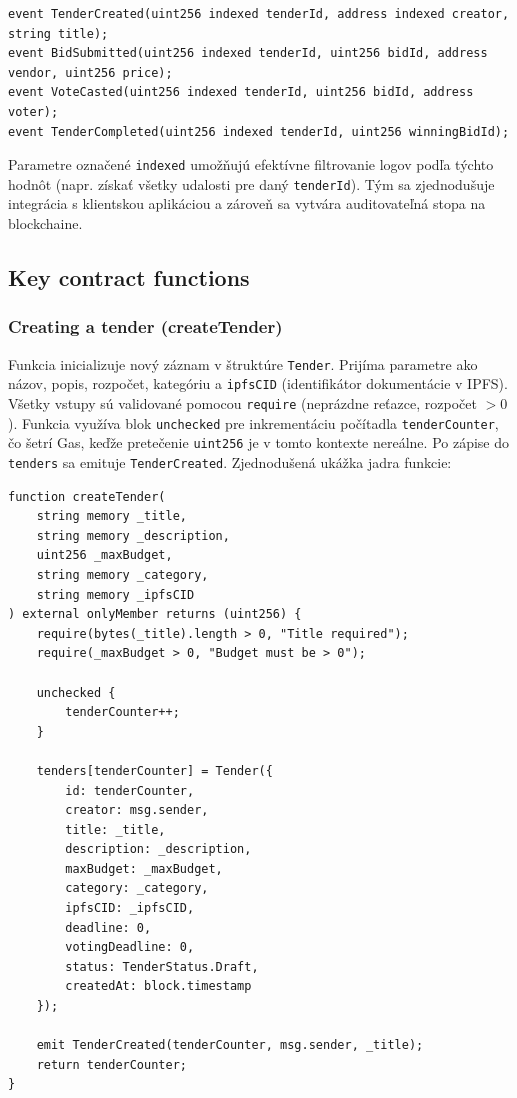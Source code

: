 \begin{lstlisting}[language=Solidity, caption={Vybraté deklarácie eventov v MicroTender.sol}, label={lst:events}]
event TenderCreated(uint256 indexed tenderId, address indexed creator, string title);
event BidSubmitted(uint256 indexed tenderId, uint256 bidId, address vendor, uint256 price);
event VoteCasted(uint256 indexed tenderId, uint256 bidId, address voter);
event TenderCompleted(uint256 indexed tenderId, uint256 winningBidId);
\end{lstlisting}

Parametre označené \texttt{indexed} umožňujú efektívne filtrovanie logov podľa týchto hodnôt (napr. získať všetky udalosti pre daný \texttt{tenderId}). Tým sa zjednodušuje integrácia s klientskou aplikáciou a zároveň sa vytvára auditovateľná stopa na blockchaine.

\subsection{Key contract functions}

\subsubsection{Creating a tender (createTender)}

Funkcia inicializuje nový záznam v štruktúre \texttt{Tender}. Prijíma parametre ako názov, popis, rozpočet, kategóriu a \texttt{ipfsCID} (identifikátor dokumentácie v IPFS). Všetky vstupy sú validované pomocou \texttt{require} (neprázdne reťazce, rozpočet $> 0$). Funkcia využíva blok \texttt{unchecked} pre inkrementáciu počítadla \texttt{tenderCounter}, čo šetrí Gas, keďže pretečenie \texttt{uint256} je v tomto kontexte nereálne. Po zápise do \texttt{tenders} sa emituje \texttt{TenderCreated}. Zjednodušená ukážka jadra funkcie:

\begin{lstlisting}[language=Solidity, caption={Jadro funkcie createTender (validácia a zápis)}, label={lst:create-tender-code}]
function createTender(
    string memory _title,
    string memory _description,
    uint256 _maxBudget,
    string memory _category,
    string memory _ipfsCID
) external onlyMember returns (uint256) {
    require(bytes(_title).length > 0, "Title required");
    require(_maxBudget > 0, "Budget must be > 0");
    
    unchecked {
        tenderCounter++;
    }
    
    tenders[tenderCounter] = Tender({
        id: tenderCounter,
        creator: msg.sender,
        title: _title,
        description: _description,
        maxBudget: _maxBudget,
        category: _category,
        ipfsCID: _ipfsCID,
        deadline: 0,
        votingDeadline: 0,
        status: TenderStatus.Draft,
        createdAt: block.timestamp
    });
    
    emit TenderCreated(tenderCounter, msg.sender, _title);
    return tenderCounter;
}
\end{lstlisting}

